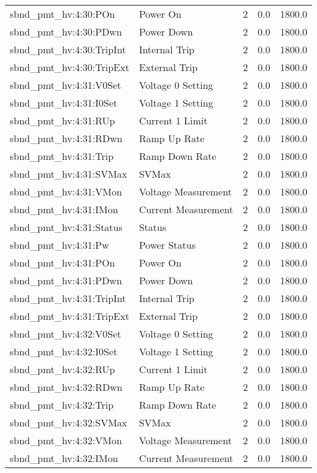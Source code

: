 \begin{center}
\begin{longtable}{l | l l l l }
sbnd\_pmt\_hv:4:30:POn & Power On & 2 & 0.0 & 1800.0\\ 
sbnd\_pmt\_hv:4:30:PDwn & Power Down & 2 & 0.0 & 1800.0\\ 
sbnd\_pmt\_hv:4:30:TripInt & Internal Trip & 2 & 0.0 & 1800.0\\ 
sbnd\_pmt\_hv:4:30:TripExt & External Trip & 2 & 0.0 & 1800.0\\ 
sbnd\_pmt\_hv:4:31:V0Set & Voltage 0 Setting & 2 & 0.0 & 1800.0\\ 
sbnd\_pmt\_hv:4:31:I0Set & Voltage 1 Setting & 2 & 0.0 & 1800.0\\ 
sbnd\_pmt\_hv:4:31:RUp & Current 1 Limit & 2 & 0.0 & 1800.0\\ 
sbnd\_pmt\_hv:4:31:RDwn & Ramp Up Rate & 2 & 0.0 & 1800.0\\ 
sbnd\_pmt\_hv:4:31:Trip & Ramp Down Rate & 2 & 0.0 & 1800.0\\ 
sbnd\_pmt\_hv:4:31:SVMax & SVMax & 2 & 0.0 & 1800.0\\ 
sbnd\_pmt\_hv:4:31:VMon & Voltage Measurement & 2 & 0.0 & 1800.0\\ 
sbnd\_pmt\_hv:4:31:IMon & Current Measurement & 2 & 0.0 & 1800.0\\ 
sbnd\_pmt\_hv:4:31:Status & Status & 2 & 0.0 & 1800.0\\ 
sbnd\_pmt\_hv:4:31:Pw & Power Status & 2 & 0.0 & 1800.0\\ 
sbnd\_pmt\_hv:4:31:POn & Power On & 2 & 0.0 & 1800.0\\ 
sbnd\_pmt\_hv:4:31:PDwn & Power Down & 2 & 0.0 & 1800.0\\ 
sbnd\_pmt\_hv:4:31:TripInt & Internal Trip & 2 & 0.0 & 1800.0\\ 
sbnd\_pmt\_hv:4:31:TripExt & External Trip & 2 & 0.0 & 1800.0\\ 
sbnd\_pmt\_hv:4:32:V0Set & Voltage 0 Setting & 2 & 0.0 & 1800.0\\ 
sbnd\_pmt\_hv:4:32:I0Set & Voltage 1 Setting & 2 & 0.0 & 1800.0\\ 
sbnd\_pmt\_hv:4:32:RUp & Current 1 Limit & 2 & 0.0 & 1800.0\\ 
sbnd\_pmt\_hv:4:32:RDwn & Ramp Up Rate & 2 & 0.0 & 1800.0\\ 
sbnd\_pmt\_hv:4:32:Trip & Ramp Down Rate & 2 & 0.0 & 1800.0\\ 
sbnd\_pmt\_hv:4:32:SVMax & SVMax & 2 & 0.0 & 1800.0\\ 
sbnd\_pmt\_hv:4:32:VMon & Voltage Measurement & 2 & 0.0 & 1800.0\\ 
sbnd\_pmt\_hv:4:32:IMon & Current Measurement & 2 & 0.0 & 1800.0\\ 

\end{longtable}
\end{center}
